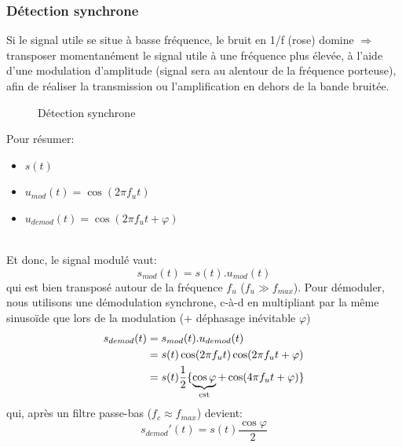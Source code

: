 \subsubsection{Détection synchrone} \label{subsubsec:detectsync}
Si le signal utile se situe à basse fréquence, le bruit en 1/f (rose) domine \(\Rightarrow\) transposer momentanément le signal utile à une fréquence plus élevée, à l'aide d'une modulation d'amplitude (signal sera au alentour de la fréquence porteuse), afin de réaliser la transmission ou l'amplification en dehors de la bande bruitée. 
\begin{figure}[H] 
	\centering 
	\caption{Détection synchrone} 
\end{figure}
Pour résumer:
\begin{itemize}
		\item { \(s(t)\)}
		\item { \(u_{mod}(t)=\cos(2\pi f_ut)\)}
		\item { \(u_{demod}(t) = \cos(2\pi f_ut+\varphi)\)}
\end{itemize}\ \\
Et donc, le signal modulé vaut:
\begin{equation}
s_{mod}(t) = s(t) . u_{mod}(t)
\end{equation}
qui est bien transposé autour de la fréquence \(f_u\) (\(f_u\gg f_{max}\)). Pour démoduler, nous utilisons une démodulation synchrone, c-à-d en multipliant par la même sinusoïde que lors de la modulation (+ déphasage inévitable \(\varphi\))
\begin{equation}
\begin{split}
s_{demod}(t) &= s_{mod}(t) . u_{demod}(t)\\
&= s(t)\cos(2\pi f_u t)\cos(2\pi f_u t+\varphi)\\
&= s(t)\frac{1}{2}\{\underbrace{\cos\varphi}_{\cst}+\cos(4\pi f_u t+\varphi)\}
\end{split}
\end{equation}
qui, après un filtre passe-bas (\(f_c \approx f_{max}\)) devient:
\begin{equation}
s_{demod}'(t) = s(t)\frac{\cos\varphi}{2}
\end{equation}
